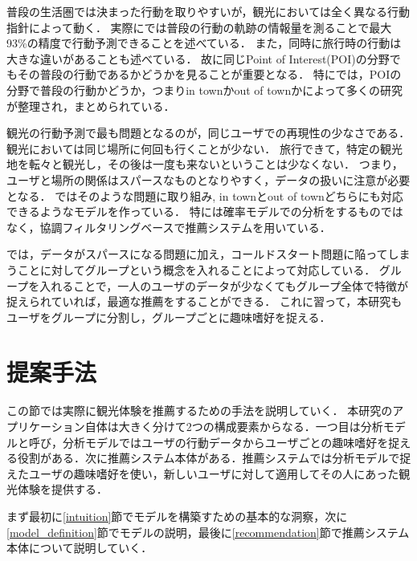 \documentclass[a4j,10pt, twocolumn]{jarticle}
\begin{document}
普段の生活圏では決まった行動を取りやすいが，観光においては全く異なる行動指針によって動く．
実際に\cite{song2010limits}では普段の行動の軌跡の情報量を測ることで最大93\%の精度で行動予測できることを述べている．
また，同時に旅行時の行動は大きな違いがあることも述べている．
故に同じPoint of Interest(POI)の分野でもその普段の行動であるかどうかを見ることが重要となる．
特に\cite{liu2017experimental}では，POIの分野で普段の行動かどうか，つまりin townかout of townかによって多くの研究が整理され，まとめられている．

観光の行動予測で最も問題となるのが，同じユーザでの再現性の少なさである．
観光においては同じ場所に何回も行くことが少ない．
旅行できて，特定の観光地を転々と観光し，その後は一度も来ないということは少なくない．
つまり，ユーザと場所の関係はスパースなものとなりやすく，データの扱いに注意が必要となる．
\cite{ference2013location}\cite{yin2013lcars}\cite{wang2015geo}\cite{yin2016joint}ではそのような問題に取り組み, in townとout of townどちらにも対応できるようなモデルを作っている．
特に\cite{ference2013location}は確率モデルでの分析をするものではなく，協調フィルタリングベースで推薦システムを用いている．

\cite{wang2015geo}\cite{zhuang2017sns}\cite{馬強2017観光情報学の最前線}\cite{馬強2019観光の分散化と個人化の実現に向けたユーザ生成コンテンツの分析と利活用技術について}では，データがスパースになる問題に加え，コールドスタート問題に陥ってしまうことに対してグループという概念を入れることによって対応している．
グループを入れることで，一人のユーザのデータが少なくてもグループ全体で特徴が捉えられていれば，最適な推薦をすることができる．
これに習って，本研究もユーザをグループに分割し，グループごとに趣味嗜好を捉える．


\section{提案手法} \label{proposed_method}
この節では実際に観光体験を推薦するための手法を説明していく．
本研究のアプリケーション自体は大きく分けて2つの構成要素からなる．一つ目は分析モデルと呼び，分析モデルではユーザの行動データからユーザごとの趣味嗜好を捉える役割がある．次に推薦システム本体がある．推薦システムでは分析モデルで捉えたユーザの趣味嗜好を使い，新しいユーザに対して適用してその人にあった観光体験を提供する．

まず最初に\ref{intuition}節でモデルを構築すための基本的な洞察，次に\ref{model_definition}節でモデルの説明，最後に\ref{recommendation}節で推薦システム本体について説明していく．
\end{document}

